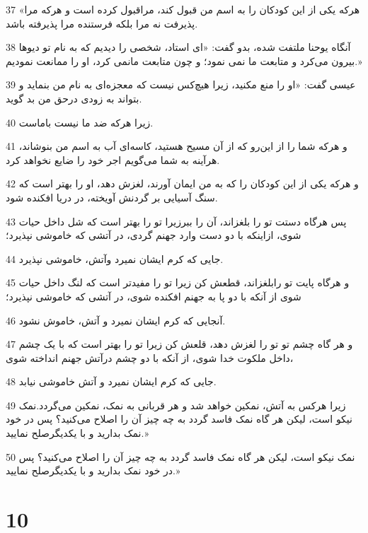 \par 37 «هرکه یکی از این کودکان را به اسم من قبول کند، مراقبول کرده است و هر‌که مرا پذیرفت نه مرا بلکه فرستنده مرا پذیرفته باشد.
\par 38 آنگاه یوحنا ملتفت شده، بدو گفت: «ای استاد، شخصی را دیدیم که به نام تو دیوها بیرون می‌کرد و متابعت ما نمی نمود؛ و چون متابعت مانمی کرد، او را ممانعت نمودیم.»
\par 39 عیسی گفت: «او را منع مکنید، زیرا هیچ‌کس نیست که معجزه‌ای به نام من بنماید و بتواند به زودی درحق من بد گوید.
\par 40 زیرا هر‌که ضد ما نیست باماست.
\par 41 و هر‌که شما را از این‌رو که از آن مسیح هستید، کاسه‌ای آب به اسم من بنوشاند، هرآینه به شما می‌گویم اجر خود را ضایع نخواهد کرد.
\par 42 و هر‌که یکی از این کودکان را که به من ایمان آورند، لغزش دهد، او را بهتر است که سنگ آسیایی بر گردنش آویخته، در دریا افکنده شود.
\par 43 پس هرگاه دستت تو را بلغزاند، آن را ببرزیرا تو را بهتر است که شل داخل حیات شوی، ازاینکه با دو دست وارد جهنم گردی، در آتشی که خاموشی نپذیرد؛
\par 44 جایی که کرم ایشان نمیرد وآتش، خاموشی نپذیرد.
\par 45 و هرگاه پایت تو رابلغزاند، قطعش کن زیرا تو را مفیدتر است که لنگ داخل حیات شوی از آنکه با دو پا به جهنم افکنده شوی، در آتشی که خاموشی نپذیرد؛
\par 46 آنجایی که کرم ایشان نمیرد و آتش، خاموش نشود.
\par 47 و هر گاه چشم تو تو را لغزش دهد، قلعش کن زیرا تو را بهتر است که با یک چشم داخل ملکوت خدا شوی، از آنکه با دو چشم درآتش جهنم انداخته شوی،
\par 48 جایی که کرم ایشان نمیرد و آتش خاموشی نیابد.
\par 49 زیرا هرکس به آتش، نمکین خواهد شد و هر قربانی به نمک، نمکین می‌گردد.نمک نیکو است، لیکن هر گاه نمک فاسد گردد به چه چیز آن را اصلاح می‌کنید؟ پس در خود نمک بدارید و با یکدیگرصلح نمایید.»
\par 50 نمک نیکو است، لیکن هر گاه نمک فاسد گردد به چه چیز آن را اصلاح می‌کنید؟ پس در خود نمک بدارید و با یکدیگرصلح نمایید.»

\chapter{10}

